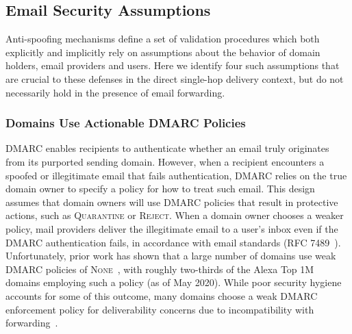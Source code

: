 \subsection{Email Security Assumptions}
\label{subsec:assumptions}
Anti-spoofing mechanisms define a set of validation procedures which
both explicitly and implicitly rely on assumptions about the behavior
of domain holders, email providers and users.  Here we identify four
such assumptions that are crucial to these defenses in the direct
single-hop delivery context, but do not necessarily hold in the
presence of email forwarding.




\subsubsection{Domains Use Actionable DMARC Policies}
\label{subsubsec:dmarc_none}
DMARC enables recipients to authenticate whether an email truly
originates from its purported sending domain.  However, when a
recipient encounters a spoofed or illegitimate email that fails
authentication, DMARC relies on the true domain owner to specify a
policy for how to treat such email.  This design assumes that domain
owners will use DMARC policies that result in protective
actions, such as \textsc{Quarantine} or \textsc{Reject}.  When a
domain owner chooses a weaker policy, mail providers deliver the
illegitimate email to a user's inbox even if the DMARC authentication
fails, in accordance with email standards (RFC 7489~\cite{rfc7489}).
Unfortunately, prior work has shown that a large number of domains use
weak DMARC policies of
\textsc{None}~\cite{hu_end--end_nodate,tatang2021evolution,hutowardsunderstanding,
  secplaintxt, maroofi2020defensive, adoptionofschemes}, with roughly
two-thirds of the Alexa Top 1M domains employing such a policy (as of
May 2020).  While poor security hygiene accounts for some of this
outcome, many domains choose a weak DMARC enforcement policy for
deliverability concerns due to incompatibility with forwarding~\cite{hutowardsunderstanding}.

